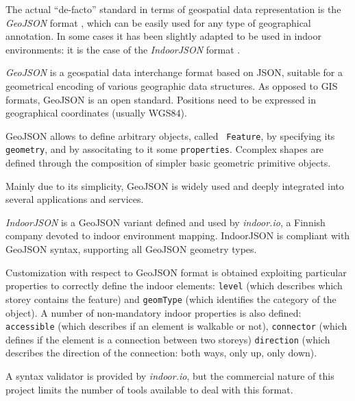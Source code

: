 The actual ``de-facto'' standard in terms of geospatial data representation is
the \emph{GeoJSON} format \cite{geojson}, which can be easily used for any type of geographical
annotation. In some cases it has been slightly adapted to be used in indoor
environments: it is the case of the \emph{IndoorJSON} format \cite{indoorjson}.

\emph{GeoJSON} is a geospatial data interchange format based on JSON, suitable for a
geometrical encoding of various geographic data structures. As opposed to GIS
formats, GeoJSON is an open standard. Positions need to be expressed in
geographical coordinates (usually WGS84).

GeoJSON \cite{geojson} allows to define arbitrary objects, called {\tt
Feature}, by specifying its {\tt geometry}, and by associtating to it some
{\tt properties}. Ccomplex shapes are defined through the composition of
simpler  basic geometric primitive objects. 

Mainly due to its simplicity,
GeoJSON is widely used and deeply integrated into several applications and
services.

\emph{IndoorJSON} \cite{indoorjson} is a GeoJSON variant defined and used by \emph{indoor.io}, a
Finnish company devoted to indoor environment mapping. IndoorJSON is compliant
with GeoJSON syntax, supporting all GeoJSON geometry types.

Customization with respect to GeoJSON format is obtained exploiting particular properties to correctly define the indoor elements: \texttt{level} (which describes which storey contains the feature) and \texttt{geomType} (which identifies the category of the object). A number of non-mandatory indoor properties is also defined: \texttt{accessible} (which describes if an element is walkable or not), \texttt{connector} (which defines if the element is a connection between two
 storeys) \texttt{direction} (which describes the direction of the connection: both
 ways, only up, only down).

A syntax validator is provided by \emph{indoor.io}, but the commercial nature
of this project limits the number of tools available to deal with this
format.
